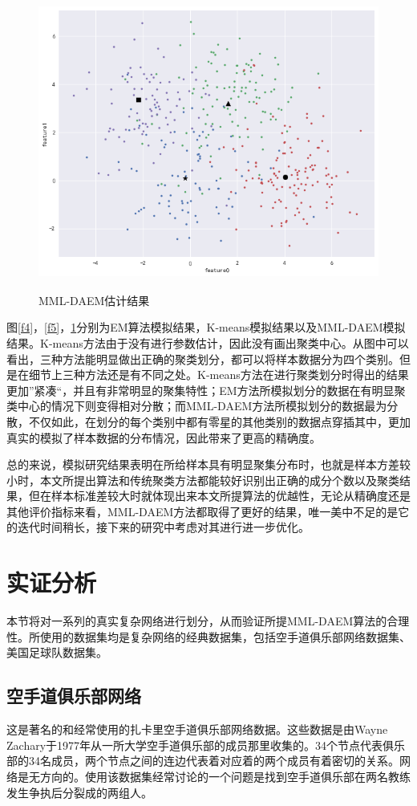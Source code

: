 \documentclass[a4paper,12pt,openany,oneside,utf-8]{ctexbook}
\begin{document}
    	\begin{figure}[H]
	\centering
	\includegraphics[width=140mm,height=90mm]{figure/1.5.png}\\
	\caption{MML-DAEM估计结果}\label{f6}
    \end{figure}
    
	图\ref{f4}，\ref{f5}，\ref{f6}分别为EM算法模拟结果，K-means模拟结果以及MML-DAEM模拟结果。K-means方法由于没有进行参数估计，因此没有画出聚类中心。从图中可以看出，三种方法能明显做出正确的聚类划分，都可以将样本数据分为四个类别。但是在细节上三种方法还是有不同之处。K-means方法在进行聚类划分时得出的结果更加”紧凑“，并且有非常明显的聚集特性；EM方法所模拟划分的数据在有明显聚类中心的情况下则变得相对分散；而MML-DAEM方法所模拟划分的数据最为分散，不仅如此，在划分的每个类别中都有零星的其他类别的数据点穿插其中，更加真实的模拟了样本数据的分布情况，因此带来了更高的精确度。
	
	总的来说，模拟研究结果表明在所给样本具有明显聚集分布时，也就是样本方差较小时，本文所提出算法和传统聚类方法都能较好识别出正确的成分个数以及聚类结果，但在样本标准差较大时就体现出来本文所提算法的优越性，无论从精确度还是其他评价指标来看，MML-DAEM方法都取得了更好的结果，唯一美中不足的是它的迭代时间稍长，接下来的研究中考虑对其进行进一步优化。
	
	
	\section{实证分析}
	本节将对一系列的真实复杂网络进行划分，从而验证所提MML-DAEM算法的合理性。所使用的数据集均是复杂网络的经典数据集，包括空手道俱乐部网络数据集、美国足球队数据集。
	
	\subsection{空手道俱乐部网络}
	这是著名的和经常使用的扎卡里空手道俱乐部网络数据。这些数据是由Wayne Zachary于1977年从一所大学空手道俱乐部的成员那里收集的。34个节点代表俱乐部的34名成员，两个节点之间的连边代表着对应着的两个成员有着密切的关系。网络是无方向的。使用该数据集经常讨论的一个问题是找到空手道俱乐部在两名教练发生争执后分裂成的两组人。
	
\end{document}
